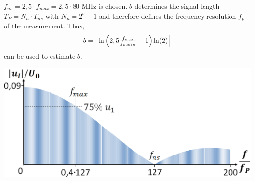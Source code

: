 \documentclass[paper=a0,accentcolor=tud9b,colorbacktitle,colorbacksubtitle]{tudposter}
\begin{document}
\begin{multicols}{2}
	 \begin{minipage}{0.195\textwidth}
	$\textstyle f_{ns}=2,5\cdot f_{max}=2,5\cdot 80\textrm{ MHz}$ is chosen. $\textstyle b$ determines the signal length $\textstyle T_P=N_n\cdot T_{ns}$ 
	with ${\textstyle N_n=2^b-1}$  
	and therefore defines the frequency resolution $\textstyle f_p$ of the measurement. Thus,
	\vspace{-0.5cm}
	\begin{equation*} 
	\textstyle
	 b=\left\lceil \ln \left( 2,5 \frac{f_{max}}{f_{p,min}}+1 \right)  \ln(2) \right\rceil
	 	\vspace{-1cm}
	\end{equation*}
	can be used to estimate $\textstyle b$.
	\end{minipage}
	\begin{minipage}{0.01\textwidth}
	 \hspace{1cm}
	\end{minipage}
	\begin{minipage}{0.34\textwidth}
	\begin{center}
	\hspace{-5cm}
	 \includegraphics[scale=0.8]{PBRS_Spektrum3.eps}
	  \label{Signal}

	\end{center}
	 \end{minipage}
	 

\end{multicols}
\end{document}
